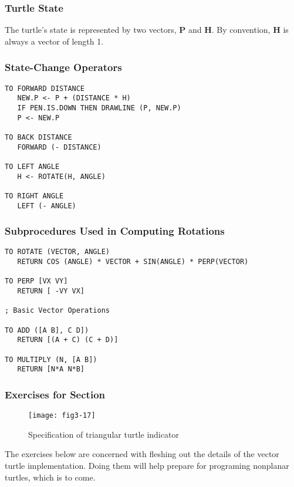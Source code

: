 \documentclass{book}
\begin{document}
\subsubsection{Turtle State}
The turtle's state is represented by two vectors, \textbf{P} and \textbf{H}. By convention,
\textbf{H} is always a vector of length 1.

\subsubsection{State-Change Operators}

\begin{verbatim}
TO FORWARD DISTANCE
   NEW.P <- P + (DISTANCE * H)
   IF PEN.IS.DOWN THEN DRAWLINE (P, NEW.P)
   P <- NEW.P

TO BACK DISTANCE
   FORWARD (- DISTANCE)

TO LEFT ANGLE
   H <- ROTATE(H, ANGLE)

TO RIGHT ANGLE
   LEFT (- ANGLE)
\end{verbatim}
\subsubsection{Subprocedures Used in Computing Rotations}

\begin{verbatim}
TO ROTATE (VECTOR, ANGLE)
   RETURN COS (ANGLE) * VECTOR + SIN(ANGLE) * PERP(VECTOR)

TO PERP [VX VY]
   RETURN [ -VY VX]

; Basic Vector Operations

TO ADD ([A B], C D])
   RETURN [(A + C) (C + D)]

TO MULTIPLY (N, [A B])
   RETURN [N*A N*B]
\end{verbatim}
\subsubsection{Exercises for Section \thesection}

\begin{figure}
\begin{center}
\texttt{[image: fig3-17]}
\caption{Specification of triangular turtle indicator}
\end{center}
\end{figure}

The exercises below are concerned with fleshing out the details of the
vector turtle implementation. Doing them will help prepare for 
programing nonplanar turtles, which is to come.
\end{document}
